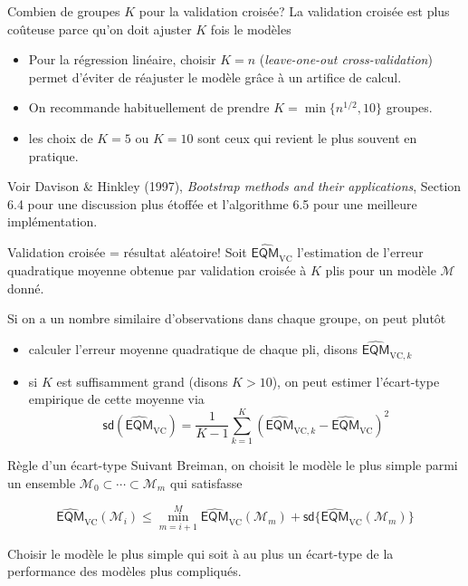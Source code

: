 \documentclass[
  ignorenonframetext,
]{beamer}
\providecommand{\tightlist}{%
  \setlength{\itemsep}{0pt}\setlength{\parskip}{0pt}}\usepackage{longtable,booktabs,array}
\begin{document}
\begin{frame}{Combien de groupes \(K\) pour la validation croisée?}
\protect\hypertarget{combien-de-groupes-k-pour-la-validation-croisuxe9e}{}
La validation croisée est plus coûteuse parce qu'on doit ajuster \(K\)
fois le modèles

\begin{itemize}
\tightlist
\item
  Pour la régression linéaire, choisir \(K=n\) (\emph{leave-one-out
  cross-validation}) permet d'éviter de réajuster le modèle grâce à un
  artifice de calcul.
\item
  On recommande habituellement de prendre \(K=\min\{n^{1/2}, 10\}\)
  groupes.
\item
  les choix de \(K=5\) ou \(K=10\) sont ceux qui revient le plus souvent
  en pratique.
\end{itemize}

\footnotesize

Voir Davison \& Hinkley (1997), \emph{Bootstrap methods and their
applications}, Section 6.4 pour une discussion plus étoffée et
l'algorithme 6.5 pour une meilleure implémentation.

\normalsize
\end{frame}

\begin{frame}{Validation croisée = résultat aléatoire!}
\protect\hypertarget{validation-croisuxe9e-ruxe9sultat-aluxe9atoire}{}
Soit \(\widehat{\mathsf{EQM}}_{\text{VC}}\) l'estimation de l'erreur
quadratique moyenne obtenue par validation croisée à \(K\) plis pour un
modèle \(\mathcal{M}\) donné.

Si on a un nombre similaire d'observations dans chaque groupe, on peut
plutôt

\begin{itemize}
\tightlist
\item
  calculer l'erreur moyenne quadratique de chaque pli, disons
  \(\widehat{\mathsf{EQM}}_{\text{VC}, k}\)
\item
  si \(K\) est suffisamment grand (disons \(K>10\)), on peut estimer
  l'écart-type empirique de cette moyenne via
  \[ \mathsf{sd}(\widehat{\mathsf{EQM}}_{\text{VC}}) = \frac{1}{K-1} \sum_{k=1}^{K} (\widehat{\mathsf{EQM}}_{\text{VC}, k}-\widehat{\mathsf{EQM}}_{\text{VC}})^2\]
\end{itemize}
\end{frame}

\begin{frame}{Règle d'un écart-type}
\protect\hypertarget{ruxe8gle-dun-uxe9cart-type}{}
Suivant Breiman, on choisit le modèle le plus simple parmi un ensemble
\(\mathcal{M}_0 \subset\cdots \subset \mathcal{M}_m\) qui satisfasse

\[\widehat{\mathsf{EQM}}_{\text{VC}}(\mathcal{M}_i) \leq \min_{m = i+1}^M \widehat{\mathsf{EQM}}_{\text{VC}}(\mathcal{M}_m) + \mathsf{sd}\{\widehat{\mathsf{EQM}}_{\text{VC}}(\mathcal{M}_m)\}\]

Choisir le modèle le plus simple qui soit à au plus un écart-type de la
performance des modèles plus compliqués.
\end{frame}
\end{document}
